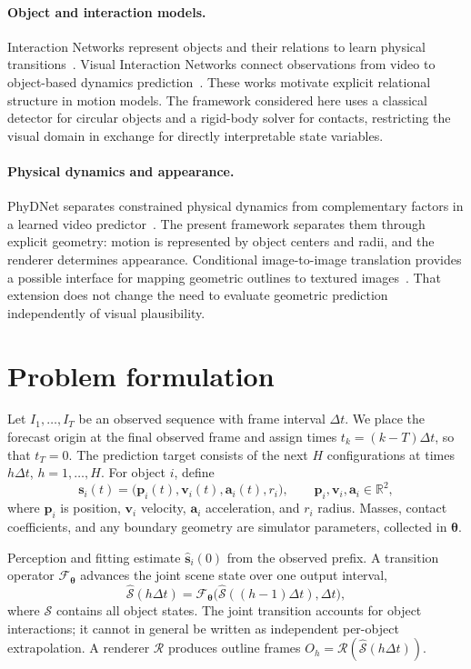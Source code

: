 \documentclass{article}
\newcommand{\pos}{\mathbf{p}}
\newcommand{\vel}{\mathbf{v}}
\newcommand{\acc}{\mathbf{a}}
\newcommand{\state}{\mathbf{s}}
\newcommand{\params}{\boldsymbol{\theta}}
\begin{document}
\paragraph{Object and interaction models.}
Interaction Networks represent objects and their relations to learn physical transitions~\citep{battaglia2016interaction}. Visual Interaction Networks connect observations from video to object-based dynamics prediction~\citep{watters2017visual}. These works motivate explicit relational structure in motion models. The framework considered here uses a classical detector for circular objects and a rigid-body solver for contacts, restricting the visual domain in exchange for directly interpretable state variables.

\paragraph{Physical dynamics and appearance.}
PhyDNet separates constrained physical dynamics from complementary factors in a learned video predictor~\citep{leguen2020phydnet}. The present framework separates them through explicit geometry: motion is represented by object centers and radii, and the renderer determines appearance. Conditional image-to-image translation provides a possible interface for mapping geometric outlines to textured images~\citep{isola2017pix2pix}. That extension does not change the need to evaluate geometric prediction independently of visual plausibility.

\section{Problem formulation}

Let $I_1,\ldots,I_T$ be an observed sequence with frame interval $\Delta t$. We place the forecast origin at the final observed frame and assign times $t_k=(k-T)\Delta t$, so that $t_T=0$. The prediction target consists of the next $H$ configurations at times $h\Delta t$, $h=1,\ldots,H$. For object $i$, define
\begin{equation}
  \state_i(t)=\bigl(\pos_i(t),\vel_i(t),\acc_i(t),r_i\bigr),
  \qquad \pos_i,\vel_i,\acc_i\in\mathbb R^2,
  \label{eq:state}
\end{equation}
where $\pos_i$ is position, $\vel_i$ velocity, $\acc_i$ acceleration, and $r_i$ radius. Masses, contact coefficients, and any boundary geometry are simulator parameters, collected in $\params$.

Perception and fitting estimate $\hat{\state}_i(0)$ from the observed prefix. A transition operator $\mathcal F_{\params}$ advances the joint scene state over one output interval,
\begin{equation}
  \hat{\mathcal S}(h\Delta t)=
  \mathcal F_{\params}\bigl(\hat{\mathcal S}((h-1)\Delta t),\Delta t\bigr),
\end{equation}
where $\mathcal S$ contains all object states. The joint transition accounts for object interactions; it cannot in general be written as independent per-object extrapolation. A renderer $\mathcal R$ produces outline frames $O_h=\mathcal R(\hat{\mathcal S}(h\Delta t))$.
\end{document}

